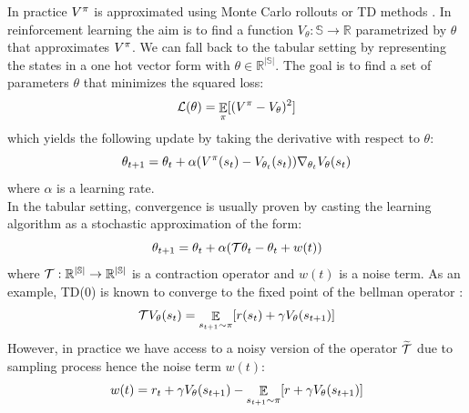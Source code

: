 In practice $V^{\pi}$ is approximated using Monte Carlo rollouts \cite{suttonreinforcement} or TD methods \cite{sutton1988learning}. In reinforcement learning the aim is to find a function $V_\theta: \mathbb{S} \rightarrow \mathbb{R}$ parametrized by $\theta$ that approximates $V^{\pi}$. We can fall back to the tabular setting by representing the states in a one hot vector form with $\theta \in \mathbb{R^{|\mathbb{S}|}}$. The goal is to find a set of parameters $\theta$ that minimizes the squared loss:
\begin{equation}\label{simple_loss}
    \mathcal{L}(\theta) = \mathop{\mathbb{E}}_{\pi} [(V^{\pi} - V_\theta)^2]
\end{equation}
which yields the following update by taking the derivative with respect to $\theta$:
\begin{equation}
    \theta_{t+1} = \theta_t + \alpha (V^{\pi}(s_t) - V_{\theta_t}(s_t)) \nabla_{\theta_t} V_{\theta}(s_t)
\end{equation}
where $\alpha$ is a learning rate.\\
In the tabular setting, convergence is usually proven by casting the learning algorithm as a stochastic approximation \cite{tsitsiklis1994asynchronous,borkar2009stochastic,borkar2000ode} of the form:
\begin{equation}\label{stoch}
    \theta_{t+1} = \theta_t + \alpha( \mathcal{T} \theta_t  - \theta_t + w(t)) 
\end{equation}
where $\mathcal{T}: \mathbb{R^{|\mathbb{S}|}} \rightarrow \mathbb{R^{|\mathbb{S}|}}$ is a contraction operator and $w(t)$ is a noise term. 
As an example, TD(0) is known to converge to the fixed point of the bellman operator \cite{sutton1988learning}:
\begin{equation}
\begin{split}
    \mathcal{T} V_{\theta}(s_t) &= \mathop{\mathbb{E}}_{s_{t+1} \sim \pi} [r(s_t) + \gamma V_{\theta}(s_{t+1})]\\
\end{split}
\end{equation}
However, in practice we have access to a noisy version of the operator $\widetilde{\mathcal{T}}$ due to sampling process hence the noise term $w(t)$:
\begin{equation}
    w(t) = r_t + \gamma V_{\theta} (s_{t+1}) - \mathop{\mathbb{E}}_{s_{t+1} \sim \pi} [r + \gamma V_{\theta}(s_{t+1})]
\end{equation}


